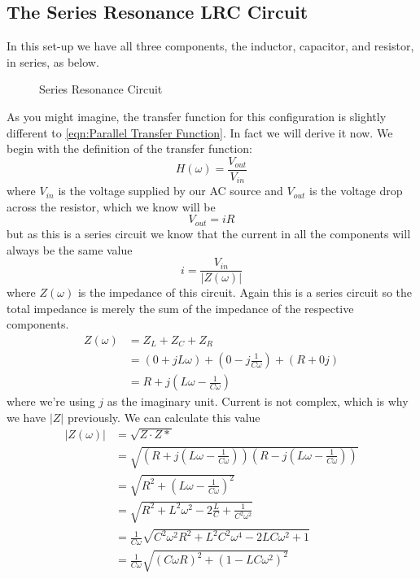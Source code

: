 \documentclass[12pt]{article}
\numberwithin{equation}{section}
\numberwithin{figure}{section}
\begin{document}
    \subsection{The Series Resonance LRC Circuit}\label{sec:Series Resonance}
    In this set-up we have all three components, the inductor, capacitor, and resistor, in series, as 
    below.
    \begin{figure}[H]
        \centering
            \def\svgwidth{0.5\textwidth}
            
            \caption{Series Resonance Circuit}
            \label{fig:Series Resonance Circuit}
    \end{figure}
    As you might imagine, the transfer function for this configuration is slightly different to 
    \autoref{eqn:Parallel Transfer Function}. In fact we will derive it now. \newline \newline
    We begin with the definition of the transfer function:
    \begin{equation*}
        H(\omega)=\frac{V_{out}}{V_{in}}
    \end{equation*}
    where $V_{in}$ is the voltage supplied by our AC source and $V_{out}$ is the voltage drop across 
    the resistor, which we know will be 
    \begin{equation*}
        V_{out}=iR
    \end{equation*}
    but as this is a series circuit we know that the current in all the components will always be the 
    same value
    \begin{equation*}
        i=\frac{V_{in}}{|Z(\omega)|}
    \end{equation*}
    where $Z(\omega)$ is the impedance of this circuit. Again this is a series circuit so the total 
    impedance is merely the sum of the impedance of the respective components.
    \begin{align*}
        Z(\omega)&=Z_L+Z_C+Z_R\\
        &=(0+jL\omega)+(0-j\frac{1}{C\omega})+(R+0j)\\
        &=R+j(L\omega-\frac{1}{C\omega})
    \end{align*}
    where we're using $j$ as the imaginary unit. Current is not complex, which is why we have $|Z|$ 
    previously. We can calculate this value
    \begin{align*}
        |Z(\omega)|&=\sqrt{Z\cdot Z*}\\
        &=\sqrt{(R+j(L\omega-\frac{1}{C\omega}))(R-j(L\omega-\frac{1}{C\omega}))}\\
        &=\sqrt{R^2+(L\omega-\frac{1}{C\omega})^2}\\
        &=\sqrt{R^2+L^2\omega^2-2\frac{L}{C}+\frac{1}{C^2\omega^2}}\\
        &=\frac{1}{C\omega}\sqrt{C^2\omega^2R^2+L^2C^2\omega^4-2LC\omega^2+1}\\
        &=\frac{1}{C\omega}\sqrt{(C\omega R)^2+(1-LC\omega^2)^2}
    \end{align*}
\end{document}
